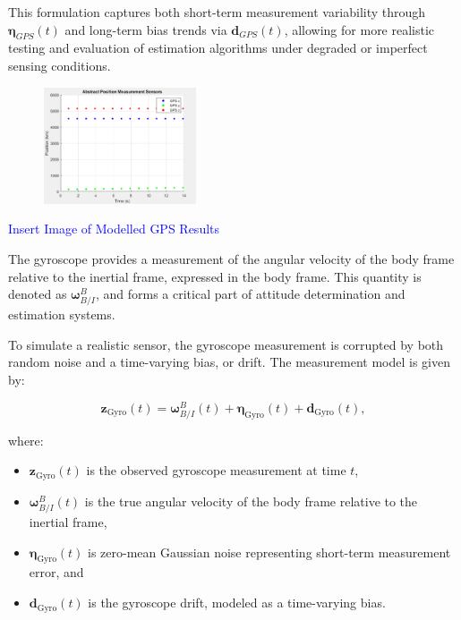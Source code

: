 \noindent This formulation captures both short-term measurement variability through $\boldsymbol{\eta}_{GPS}(t)$ and long-term bias trends 
via $\mathbf{d}_{GPS}(t)$, allowing for more realistic testing and evaluation of estimation algorithms under degraded or imperfect sensing conditions.
\begin{figure}[H]
    \centering
    \includegraphics[width=0.4\textwidth]{figures/modelling/GPSMeasurement.png}
    \caption{}
    \label{fig:GPS}
\end{figure}



\textcolor{blue}{Insert Image of Modelled GPS Results}


The gyroscope provides a measurement of the angular velocity of the body frame relative to the inertial frame, expressed in the body frame. This quantity is denoted as $\boldsymbol{\omega}^B_{B/I}$, and forms a critical part of attitude determination and estimation systems.

To simulate a realistic sensor, the gyroscope measurement is corrupted by both random noise and a time-varying bias, or drift. The measurement model is given by:

\begin{equation}
    \mathbf{z}_{\text{Gyro}}(t) = \boldsymbol{\omega}^B_{B/I}(t) + \boldsymbol{\eta}_{\text{Gyro}}(t) + \mathbf{d}_{\text{Gyro}}(t),
\end{equation}

where:
\begin{itemize}
    \item $\mathbf{z}_{\text{Gyro}}(t)$ is the observed gyroscope measurement at time $t$,
    \item $\boldsymbol{\omega}^B_{B/I}(t)$ is the true angular velocity of the body frame relative to the inertial frame,
    \item $\boldsymbol{\eta}_{\text{Gyro}}(t)$ is zero-mean Gaussian noise representing short-term measurement error, and
    \item $\mathbf{d}_{\text{Gyro}}(t)$ is the gyroscope drift, modeled as a time-varying bias.
\end{itemize}

